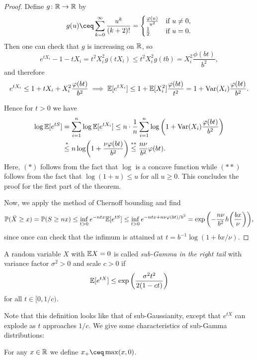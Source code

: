 \begin{proof}
	Define $g \colon \mathbb R \to \mathbb R$ by 
	\[
	g(u) \ceq \sum_{k=0}^\infty \frac{u^k}{(k+2)!} = \begin{cases}
		\frac{\phi(u)}{u^2}&\text{if $u \neq 0$}, \\
		\frac12 &\text{if $u = 0$}. 
	\end{cases} 
	\]
	Then one can check that $g$ is increasing on $\mathbb R$, so 
	\[
	e^{tX_i} - 1 - t X_i = t^2 X_i^2 g(tX_i) \leq t^2 X_i^2 g(tb) = X_i^2 \frac{\phi(bt)}{b^2},
	\]
	and therefore
	\[
	e^{tX_i} \leq 1 + tX_i + X_i^2 \frac{\varphi(bt)}{b^2} \implies \mathbb E[e^{tX_i}] \leq 1 + \mathbb E[X_i^2] \frac{\varphi(bt)}{t^2} = 1 + \operatorname{Var}(X_i) \frac{\varphi(bt)}{b^2}. 
	\]
	
	Hence for $t > 0$ we have
	\begin{align*}
		\log \mathbb E[e^{tS}] &= \sum_{i=1}^n \log\mathbb E[e^{tX_i}] \leq n \cdot \frac1n\sum_{i=1}^n \log\qty(1 + \operatorname{Var}(X_i) \frac{\varphi(bt)}{b^2}) \\
		&\overset*\leq n \log(1 + \frac{\nu \varphi(bt)}{b^2}) \overset{**}\leq  \frac{n\nu}{b^2}\varphi(bt).
	\end{align*}
Here, $(*)$ follows from the fact that $\log$ is a concave function while $(**)$ follows from the fact that $\log(1+u) \leq u$ for all $u \geq 0$. This concludes the proof for the first part of the theorem.

Now, we apply the method of Chernoff bounding and find
\[
\mathbb P(\bar X \geq x) = \mathbb P(S \geq nx) \leq \inf_{t > 0} e^{-ntx} \mathbb E[e^{t S}] \leq \inf_{t > 0} e^{-ntx + n\nu \varphi(bt)/b^2} = \exp\qty(-\frac{n\nu}{b^2} h\qty(\frac{bx}{\nu})),
\]
since once can check that the infimum is attained at $t = b^{-1} \log(1 + bx/\nu)$. 
\end{proof}

\begin{definition}
	A random variable $X$ with $\mathbb E X = 0$ is called \emph{sub-Gamma in the right tail} with variance factor $\sigma^2 > 0$ and scale $c > 0$ if
	\[
	\mathbb E[e^{tX}] \leq \exp\qty(\frac{\sigma^2 t^2}{2(1 - ct)})
	\]
	for all $t \in [0, 1/c)$. 
\end{definition}

Note that this definition looks like that of sub-Gaussianity, except that $e^{tX}$ can explode as $t$ approaches $1/c$. We give some characteristics of sub-Gamma distributions:

\begin{definition}
	For any $x \in \mathbb R$ we define $x_+ \ceq \max(x, 0)$. 
\end{definition}

